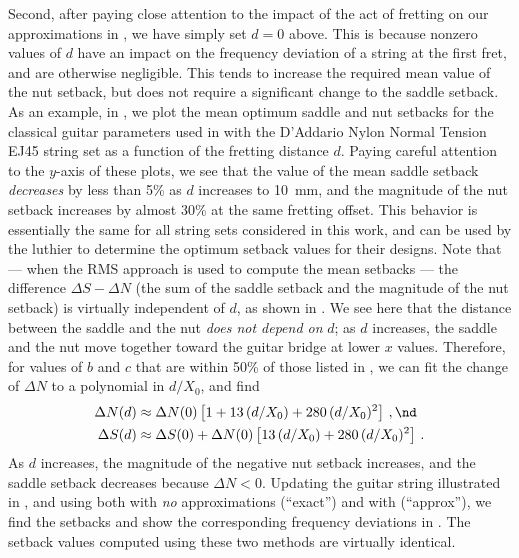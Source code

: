 Second, after paying close attention to the impact of the act of fretting on our approximations in , we have simply set $d = 0$ above. This is because nonzero values of $d$ have an impact on the frequency deviation of a string at the first fret, and are otherwise negligible. This tends to increase the required mean value of the nut setback, but does not require a significant change to the saddle setback. As an example, in , we plot the mean optimum saddle and nut setbacks for the classical guitar parameters used in  with the D'Addario Nylon Normal Tension EJ45 string set as a function of the fretting distance $d$. Paying careful attention to the $y$-axis of these plots, we see that the value of the mean saddle setback \emph{decreases} by less than 5\% as $d$ increases to 10~mm, and the magnitude of the nut setback increases by almost 30\% at the same fretting offset. This behavior is essentially the same for all string sets considered in this work, and can be used by the luthier to determine the optimum setback values for their designs. Note that --- when the RMS approach is used to compute the mean setbacks --- the difference $\Delta S - \Delta N$ (the sum of the saddle setback and the magnitude of the nut setback) is virtually independent of $d$, as shown in . We see here that the distance between the saddle and the nut \emph{does not depend on} $d$; as $d$ increases, the saddle and the nut move together toward the guitar bridge at lower $x$ values. Therefore, for values of $b$ and $c$ that are within 50\% of those listed in , we can fit the change of $\Delta N$ to a polynomial in $d/X_0$, and find
\begin{align} \label{eqn:comp_d_poly}
  \Delta N(d) &\approx \Delta N(0) \left[ 1 + 13\, (d/X_0) + 280\, (d/X_0)^2 \right]\, , \nd \\
  \Delta S(d) &\approx \Delta S(0) + \Delta N(0) \left[13\, (d/X_0) + 280\, (d/X_0)^2 \right]\, .
\end{align}
As $d$ increases, the magnitude of the negative nut setback increases, and the saddle setback decreases because $\Delta N < 0$. Updating the guitar string illustrated in , and using both  with \emph{no} approximations (``exact'') and  with  (``approx''), we find the setbacks and show the corresponding frequency deviations in . The setback values computed using these two methods are virtually identical.

